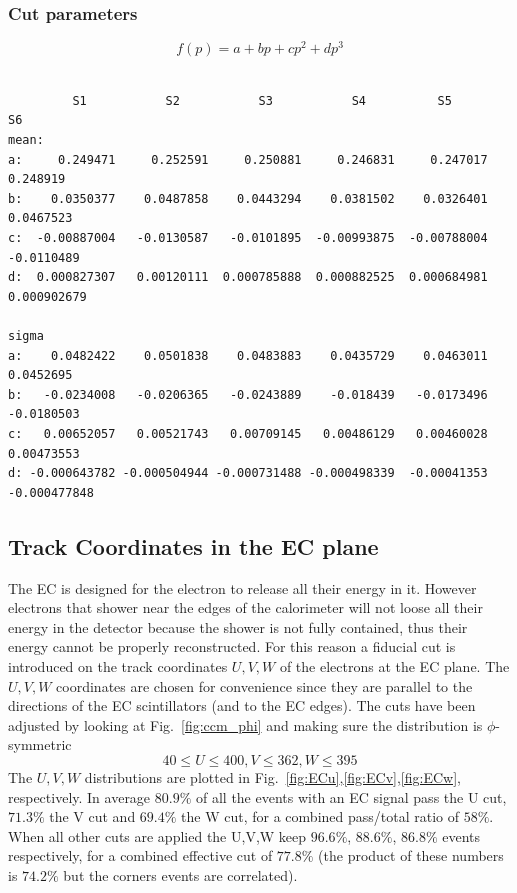 \subsubsection{Cut parameters}\label{sec:ecp_parameters}
$$
f(p) = a + bp + cp^2 + dp^3
$$
\begin{verbatim}   

         S1           S2           S3           S4          S5            S6
mean:
a:     0.249471     0.252591     0.250881     0.246831     0.247017     0.248919
b:    0.0350377    0.0487858    0.0443294    0.0381502    0.0326401    0.0467523
c:  -0.00887004   -0.0130587   -0.0101895  -0.00993875  -0.00788004   -0.0110489
d:  0.000827307   0.00120111  0.000785888  0.000882525  0.000684981  0.000902679

sigma 
a:    0.0482422    0.0501838    0.0483883    0.0435729    0.0463011    0.0452695
b:   -0.0234008   -0.0206365   -0.0243889    -0.018439   -0.0173496   -0.0180503
c:   0.00652057   0.00521743   0.00709145   0.00486129   0.00460028   0.00473553
d: -0.000643782 -0.000504944 -0.000731488 -0.000498339  -0.00041353 -0.000477848
\end{verbatim}

\clearpage\newpage
\subsection{Track Coordinates in the EC plane}
The EC is designed for the electron to release all their energy in it.
However electrons that shower near the edges of the calorimeter will not loose
all their energy in the detector because the shower is not fully contained,
thus their energy cannot be properly reconstructed. For this reason 
a fiducial cut is introduced on the track coordinates $U,V,W$ 
of the electrons at the EC plane. The $U,V,W$ coordinates are chosen for 
convenience since they are parallel to the directions of the EC scintillators 
(and to the EC edges). The cuts have been adjusted by looking at Fig.~\ref{fig:ccm_phi}
and making sure the distribution is $\phi$-symmetric
$$
 40\leq U\leq400, V\leq362, W\leq395
$$
The $U,V,W$ distributions are plotted in Fig.~\ref{fig:ECu},\ref{fig:ECv},\ref{fig:ECw},
respectively. In average $80.9\%$ of all the events with an EC signal pass the U cut, $71.3\%$ the V cut
and $69.4\%$ the W cut, for a combined pass/total ratio of $58\%$.  When all other cuts are applied
the U,V,W keep $96.6\%$, $88.6\%$, $86.8\%$ events respectively, for a combined effective cut of $77.8\%$
(the product of these numbers is  $74.2\%$ but the corners events are correlated).

